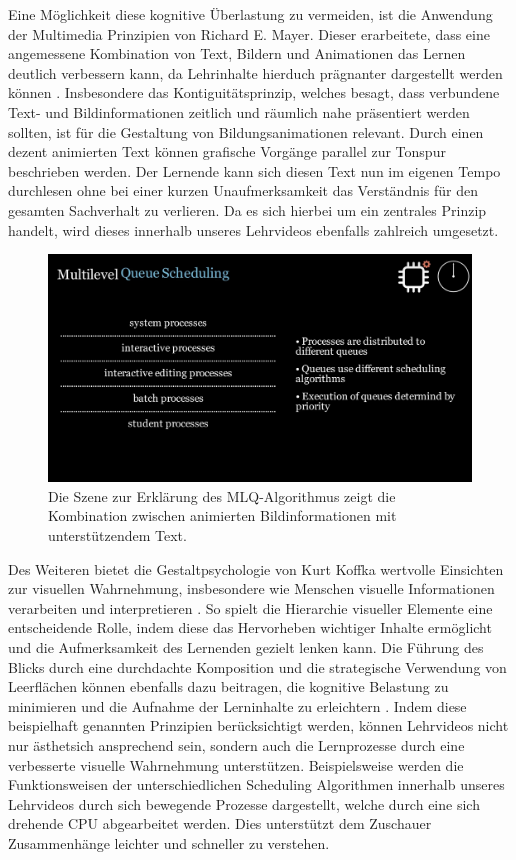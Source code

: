 Eine Möglichkeit diese kognitive Überlastung zu vermeiden, ist die Anwendung der Multimedia Prinzipien von Richard E. Mayer. Dieser erarbeitete, dass eine angemessene Kombination von Text, Bildern und Animationen das Lernen deutlich verbessern kann, da Lehrinhalte hierduch prägnanter dargestellt werden können \autocite{mayer_multimedia_2002}. Insbesondere das Kontiguitätsprinzip, welches besagt, dass verbundene Text- und Bildinformationen zeitlich und räumlich nahe präsentiert werden sollten, ist für die Gestaltung von Bildungsanimationen relevant. Durch einen dezent animierten Text können grafische Vorgänge parallel zur Tonspur beschrieben werden. Der Lernende kann sich diesen Text nun im eigenen Tempo durchlesen ohne bei einer kurzen Unaufmerksamkeit das Verständnis für den gesamten Sachverhalt zu verlieren. Da es sich hierbei um ein zentrales Prinzip handelt, wird dieses innerhalb unseres Lehrvideos ebenfalls zahlreich umgesetzt. 

\begin{figure}[h]
	\centering
	\includegraphics[width=0.8\linewidth]{img/screen_text.png} 
	\caption{Die Szene zur Erklärung des \ac{MLQ}-Algorithmus zeigt die Kombination zwischen animierten Bildinformationen mit unterstützendem Text.}
	\label{fig:screen_text} 
\end{figure}

Des Weiteren bietet die Gestaltpsychologie von Kurt Koffka wertvolle Einsichten zur visuellen Wahrnehmung, insbesondere wie Menschen visuelle Informationen verarbeiten und interpretieren \autocite{koffka_principles_1999}. So spielt die Hierarchie visueller Elemente eine entscheidende Rolle, indem diese das Hervorheben wichtiger Inhalte ermöglicht und die Aufmerksamkeit des Lernenden gezielt lenken kann. Die Führung des Blicks durch eine durchdachte Komposition und die strategische Verwendung von Leerflächen können ebenfalls dazu beitragen, die kognitive Belastung zu minimieren und die Aufnahme der Lerninhalte zu erleichtern \autocite{koffka_principles_1999}.
Indem diese beispielhaft genannten Prinzipien berücksichtigt werden, können Lehrvideos nicht nur ästhetsich ansprechend sein, sondern auch die Lernprozesse durch eine verbesserte visuelle Wahrnehmung unterstützen. Beispielsweise werden die Funktionsweisen der unterschiedlichen Scheduling Algorithmen innerhalb unseres Lehrvideos durch sich bewegende Prozesse dargestellt, welche durch eine sich drehende \ac{CPU} abgearbeitet werden. Dies unterstützt dem Zuschauer Zusammenhänge leichter und schneller zu verstehen. 


